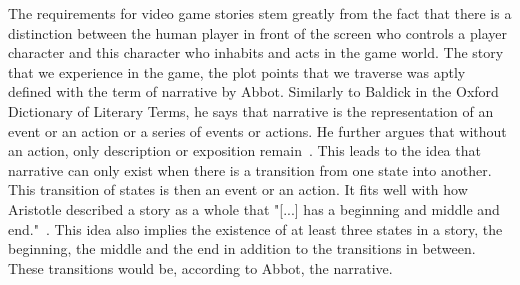 The requirements for video game stories stem greatly from the fact that there is a distinction between the human player in front of the screen who controls a player character and this character who inhabits and acts in the game world. The story that we experience in the game, the plot points that we traverse was aptly defined with the term of narrative by Abbot. Similarly to Baldick in the Oxford Dictionary of Literary Terms, he says that narrative is the representation of an event or an action or a series of events or actions. He further argues that without an action, only description or exposition remain~\cite{Abbott2020}. This leads to the idea that narrative can only exist when there is a transition from one state into another. This transition of states is then an event or an action. It fits well with how Aristotle described a story as a whole that "[...] has a beginning and middle and end."~\cite{Aristotle2006}. This idea also implies the existence of at least three states in a story, the beginning, the middle and the end in addition to the transitions in between. These transitions would be, according to Abbot, the narrative.
